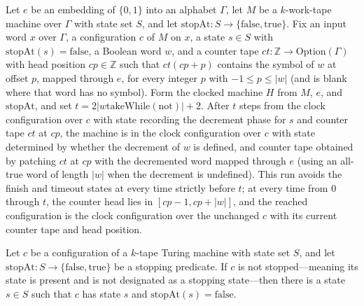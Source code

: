\begin{theorem}
\label{Turing.sc_clockDebit}
\leanok
{}
Let $e$ be an embedding of $\{0,1\}$ into an alphabet $\Gamma$, let $M$ be a
$k$-work-tape machine over $\Gamma$ with state set $S$, and let
$\mathrm{stopAt}:S\to\{\mathrm{false},\mathrm{true}\}$. Fix an input word $x$ over
$\Gamma$, a configuration $c$ of $M$ on $x$, a state $s\in S$ with
$\mathrm{stopAt}(s)=\mathrm{false}$, a Boolean word $w$, and a counter tape
$ct:\mathbb Z\to\mathrm{Option}(\Gamma)$ with head position $cp\in\mathbb Z$ such
that $ct(cp+p)$ contains the symbol of $w$ at offset $p$, mapped through $e$, for every
integer $p$ with $-1\le p\le |w|$ (and is blank where that word has no symbol). Form
the clocked machine $H$ from $M$, $e$, and $\mathrm{stopAt}$, and set
$t=2|w\mathbin{\mathrm{takeWhile}}(\mathrm{not})|+2$. After $t$ steps from the clock
configuration over $c$ with state recording the decrement phase for $s$ and counter tape
$ct$ at $cp$, the machine is in the clock configuration over $c$ with state determined
by whether the decrement of $w$ is defined, and counter tape obtained by patching $ct$
at $cp$ with the decremented word mapped through $e$ (using an all-true word of length
$|w|$ when the decrement is undefined). This run avoids the finish and timeout states at
every time strictly before $t$; at every time from $0$ through $t$, the counter head
lies in $[cp-1,cp+|w|]$, and the reached configuration is the clock configuration over
the unchanged $c$ with its current counter tape and head position.
\end{theorem}

\begin{theorem}
\label{Turing.sc_live}
\leanok
{}
Let $c$ be a configuration of a $k$-tape Turing machine with state set $S$, and let
$\mathrm{stopAt}:S\to\{\mathrm{false},\mathrm{true}\}$ be a stopping predicate. If $c$
is not stopped—meaning its state is present and is not designated as a stopping
state—then there is a state $s\in S$ such that $c$ has state $s$ and
$\mathrm{stopAt}(s)=\mathrm{false}$.
\end{theorem}

